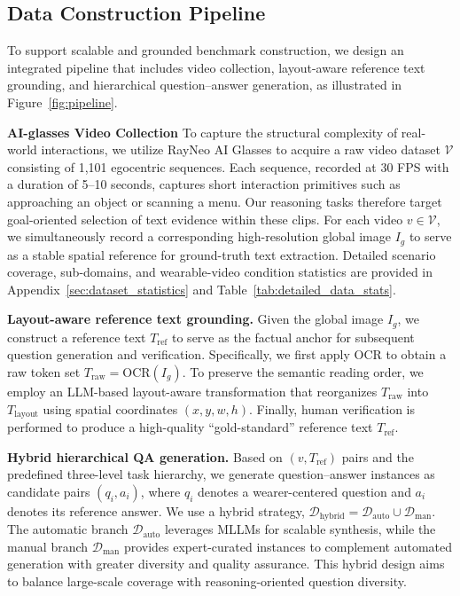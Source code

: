 \subsection{Data Construction Pipeline}
\label{sec:data_pipeline}

To support scalable and grounded benchmark construction, 
we design an integrated pipeline that includes video collection, 
layout-aware reference text grounding, and hierarchical question--answer generation, 
as illustrated in Figure~\ref{fig:pipeline}.

\noindent\textbf{AI-glasses Video Collection}
To capture the structural complexity of real-world interactions, 
we utilize RayNeo AI Glasses to acquire a raw video dataset $\mathcal{V}$ consisting of 1,101 egocentric sequences. Each sequence, recorded at 30 FPS with a duration of 5--10 seconds, 
captures short interaction primitives such as approaching an object or scanning a menu. Our reasoning tasks therefore target goal-oriented selection of text evidence within these clips. 
For each video $v \in \mathcal{V}$, we simultaneously record a corresponding high-resolution global image $I_g$ to serve as a stable spatial reference for ground-truth text extraction. 
Detailed scenario coverage, sub-domains, and wearable-video condition statistics are provided in Appendix~\ref{sec:dataset_statistics} and Table~\ref{tab:detailed_data_stats}.

\noindent\textbf{Layout-aware reference text grounding.}
Given the global image $I_g$, we construct a reference text $T_{\text{ref}}$ to serve as the factual anchor for subsequent question generation and verification. Specifically, we first apply OCR to obtain a raw token set $T_{\text{raw}} = \text{OCR}(I_g)$. To preserve the semantic reading order, we employ an LLM-based layout-aware transformation that reorganizes $T_{\text{raw}}$ into $T_{\text{layout}}$ using spatial coordinates $(x, y, w, h)$.
Finally, human verification is performed to produce a high-quality “gold-standard” reference text $T_{\text{ref}}$.

\noindent\textbf{Hybrid hierarchical QA generation.}
Based on $(v, T_{\text{ref}})$ pairs and the predefined three-level task hierarchy, we generate question--answer instances as candidate pairs $(q_i, a_i)$, where $q_i$ denotes a wearer-centered question and $a_i$ denotes its reference answer. We use a hybrid strategy, $\mathcal{D}_{\text{hybrid}} = \mathcal{D}_{\text{auto}} \cup \mathcal{D}_{\text{man}}$. The automatic branch $\mathcal{D}_{\text{auto}}$ leverages MLLMs for scalable synthesis, while the manual branch $\mathcal{D}_{\text{man}}$ provides expert-curated instances to complement automated generation with greater diversity and quality assurance. This hybrid design aims to balance large-scale coverage with reasoning-oriented question diversity.



